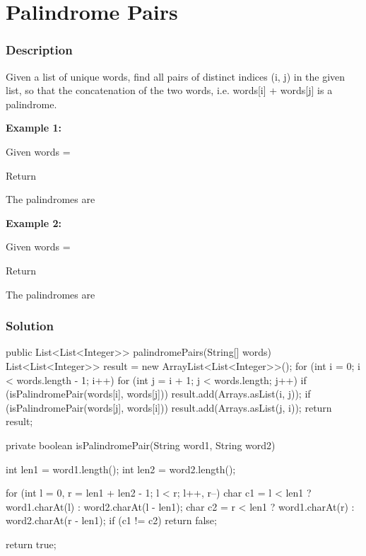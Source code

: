\begin{Code}

\end{Code}

\newpage

\section{Palindrome Pairs} %

\subsubsection{Description}
Given a list of unique words, find all pairs of distinct indices (i, j) in the given list, so that the concatenation of the two words, i.e. words[i] + words[j] is a palindrome.

\textbf{Example 1:}

Given words = 

Return \code{[[0, 1], [1, 0]]}

The palindromes are 

\textbf{Example 2:}

Given words = 

Return \code{[[0, 1], [1, 0], [3, 2], [2, 4]]}

The palindromes are 

\subsubsection{Solution}

\begin{Code}
public List<List<Integer>> palindromePairs(String[] words) {
    List<List<Integer>> result = new ArrayList<List<Integer>>();
    for (int i = 0; i < words.length - 1; i++) {
        for (int j = i + 1; j < words.length; j++) {
            if (isPalindromePair(words[i], words[j])) {
                result.add(Arrays.asList(i, j));
            }
            if (isPalindromePair(words[j], words[i])) {
                result.add(Arrays.asList(j, i));
            }
        }
    }
    return result;
}

private boolean isPalindromePair(String word1, String word2) {
    int len1 = word1.length();
    int len2 = word2.length();

    for (int l = 0, r = len1 + len2 - 1; l < r; l++, r--) {
        char c1 = l < len1 ? word1.charAt(l) : word2.charAt(l - len1);
        char c2 = r < len1 ? word1.charAt(r) : word2.charAt(r - len1);
        if (c1 != c2) {
            return false;
        }
    }

    return true;
}
\end{Code}


